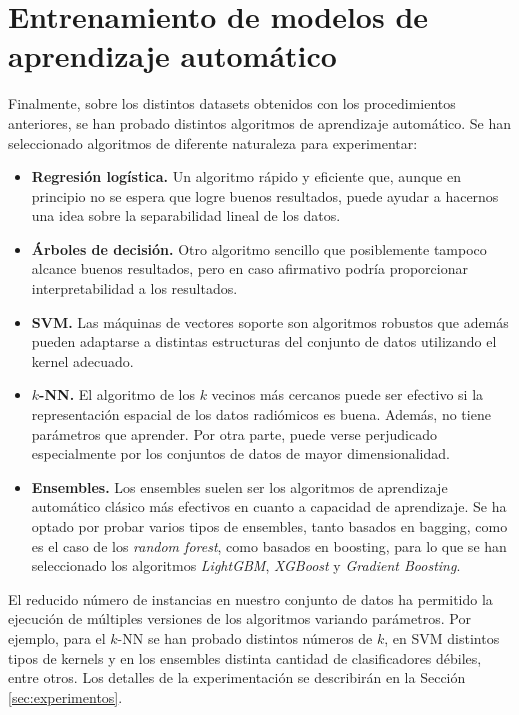 \section{Entrenamiento de modelos de aprendizaje automático}

Finalmente, sobre los distintos datasets obtenidos con los procedimientos anteriores, se han probado distintos algoritmos de aprendizaje automático. Se han seleccionado algoritmos de diferente naturaleza para experimentar:

\begin{itemize}
    \item \textbf{Regresión logística.} Un algoritmo rápido y eficiente que, aunque en principio no se espera que logre buenos resultados, puede ayudar a hacernos una idea sobre la separabilidad lineal de los datos.
    \item \textbf{Árboles de decisión.} Otro algoritmo sencillo que posiblemente tampoco alcance buenos resultados, pero en caso afirmativo podría proporcionar interpretabilidad a los resultados.
    \item \textbf{SVM.} Las máquinas de vectores soporte son algoritmos robustos que además pueden adaptarse a distintas estructuras del conjunto de datos utilizando el kernel adecuado.
    \item \textbf{$k$-NN.} El algoritmo de los $k$ vecinos más cercanos puede ser efectivo si la representación espacial de los datos radiómicos es buena. Además, no tiene parámetros que aprender. Por otra parte, puede verse perjudicado especialmente por los conjuntos de datos de mayor dimensionalidad.
    \item \textbf{Ensembles.} Los ensembles suelen ser los algoritmos de aprendizaje automático clásico más efectivos en cuanto a capacidad de aprendizaje. Se ha optado por probar varios tipos de ensembles, tanto basados en bagging, como es el caso de los \emph{random forest}, como basados en boosting, para lo que se han seleccionado los algoritmos \emph{LightGBM}, \emph{XGBoost} y \emph{Gradient Boosting}.
\end{itemize}

El reducido número de instancias en nuestro conjunto de datos ha permitido la ejecución de múltiples versiones de los algoritmos variando parámetros. Por ejemplo, para el $k$-NN se han probado distintos números de $k$, en SVM distintos tipos de kernels y en los ensembles distinta cantidad de clasificadores débiles, entre otros. Los detalles de la experimentación se describirán en la Sección \ref{sec:experimentos}.


